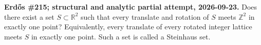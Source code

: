 \textbf{Erd\H{o}s \#215; structural and analytic partial attempt, 2026-09-23.}
Does there exist a set $S\subset\mathbb R^2$ such that every translate and rotation of $S$ meets $\mathbb Z^2$ in exactly one point? Equivalently, every translate of every rotated integer lattice meets $S$ in exactly one point. Such a set is called a Steinhaus set.
